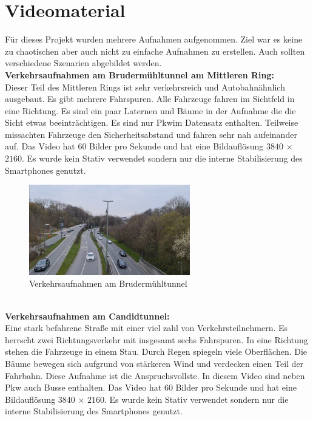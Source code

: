 \documentclass[conference]{IEEEtran}
\begin{document}
	\section{Videomaterial}
	Für dieses Projekt wurden mehrere Aufnahmen aufgenommen. Ziel war es keine zu chaotischen aber auch nicht zu einfache Aufnahmen zu erstellen. Auch sollten verschiedene Szenarien abgebildet werden.\\
	\textbf{Verkehrsaufnahmen am Brudermühltunnel am Mittleren Ring:}\\
	Dieser Teil des Mittleren Rings ist sehr verkehrsreich und Autobahnähnlich ausgebaut. Es gibt mehrere Fahrspuren. Alle Fahrzeuge fahren im Sichtfeld in eine Richtung. Es sind ein paar Laternen und Bäume in der Aufnahme die die Sicht etwas beeinträchtigen. Es sind nur Pkwim Datensatz enthalten. Teilweise missachten Fahrzeuge den Sicherheitsabstand und fahren sehr nah aufeinander auf. Das Video hat 60 Bilder pro Sekunde und hat eine Bildauflösung $3840$ × $2160$. Es wurde kein Stativ verwendet sondern nur die interne Stabilisierung des Smartphones genutzt.
	\begin{figure}[!h]
		\begin{center}
			\includegraphics[width=7cm]{Media/BrudermuhlRaw.png}
			\caption{Verkehrsaufnahmen am Brudermühltunnel}
			\label{BrudermuhlRaw}
		\end{center}
	\end{figure}\\
	\textbf{Verkehrsaufnahmen am Candidtunnel:}\\
	Eine stark befahrene Straße mit einer viel zahl von Verkehrsteilnehmern. Es herrscht zwei Richtungsverkehr mit insgesamt sechs Fahrspuren. In eine Richtung stehen die Fahrzeuge in einem Stau. Durch Regen spiegeln viele Oberflächen. Die Bäume bewegen sich aufgrund von stärkeren Wind und verdecken einen Teil der Fahrbahn. Diese Aufnahme ist die Anspruchsvollste. In diesem Video sind neben Pkw auch Busse enthalten. Das Video hat 60 Bilder pro Sekunde und hat eine Bildauflösung $3840$ × $2160$. Es wurde kein Stativ verwendet sondern nur die interne Stabilisierung des Smartphones genutzt.
\end{document}
